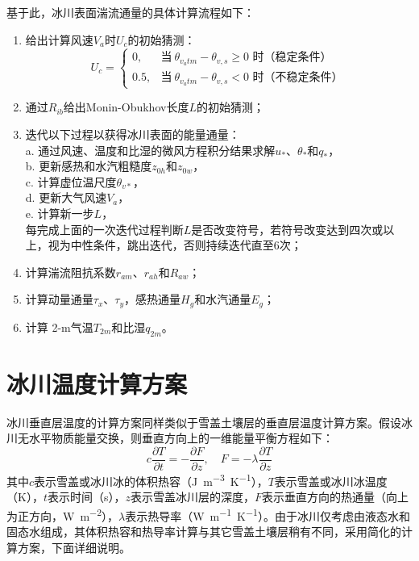 基于此，冰川表面湍流通量的具体计算流程如下：
\begin{enumerate}
    \item 给出计算风速$V_a$时$U_c$的初始猜测：
        \begin{equation}
            U_c = \begin{cases}
                0, &\text{当}\ \theta_{v_atm}-\theta_{v,s} \geqslant 0 \text{ 时（稳定条件）} \\
                0.5, &\text{当}\ \theta_{v_atm}-\theta_{v,s} < 0 \text{ 时（不稳定条件）}
            \end{cases}
        \end{equation}
    \item 通过$R_{ib}$给出Monin-Obukhov长度$L$的初始猜测；
    \item 迭代以下过程以获得冰川表面的能量通量：\\
        a. 通过风速、温度和比湿的微风方程积分结果求解$u_*$、$\theta_*$和$q_*$，\\
        b. 更新感热和水汽粗糙度$z_{0h}$和$z_{0w}$，\\
        c. 计算虚位温尺度$\theta_{v*}$，\\
        d. 更新大气风速$V_a$，\\
        e. 计算新一步$L$，\\
        每完成上面的一次迭代过程判断$L$是否改变符号，若符号改变达到四次或以上，视为中性条件，跳出迭代，否则持续迭代直至6次；
    \item 计算湍流阻抗系数$r_{am}$、$r_{ah}$和$R_{aw}$；
    \item 计算动量通量$\tau_x$、$\tau_y$，感热通量$H_g$和水汽通量$E_g$；
    \item 计算 2-m气温$T_{2m}$和比湿$q_{2m}$。
\end{enumerate}

\section{冰川温度计算方案}
冰川垂直层温度的计算方案同样类似于雪盖土壤层的垂直层温度计算方案。假设冰川无水平物质能量交换，则垂直方向上的一维能量平衡方程如下：
\begin{equation}\label{eq:GlacierThermalCons}
    c \frac{\partial T}{\partial t}=-\frac{\partial F}{\partial z},  \quad F=-\lambda \frac{\partial T}{\partial z}
\end{equation}
其中$c$表示雪盖或冰川冰的体积热容（\unit{J.m^{-3}.K^{-1}}），$T$表示雪盖或冰川冰温度（K），$t$表示时间（s），$z$表示雪盖冰川层的深度，$F$表示垂直方向的热通量（向上为正方向，\unit{W.m^{-2}}），$\lambda$表示热导率（\unit{W.m^{-1}.K^{-1}}）。由于冰川仅考虑由液态水和固态水组成，其体积热容和热导率计算与其它雪盖土壤层稍有不同，采用简化的计算方案，下面详细说明。

